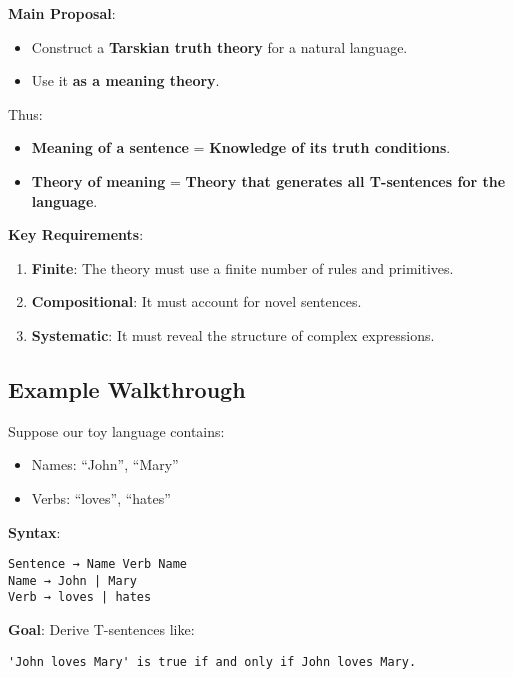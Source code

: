 \documentclass[12pt]{article}
\newcommand{\tightlist}{\itemsep 0pt\parskip 0pt\parsep 0pt}
\begin{document}
\textbf{Main Proposal}:

\begin{itemize}
\tightlist
\item
  Construct a \textbf{Tarskian truth theory} for a natural language.
\item
  Use it \textbf{as a meaning theory}.
\end{itemize}

Thus:

\begin{itemize}
\tightlist
\item
  \textbf{Meaning of a sentence} = \textbf{Knowledge of its truth
  conditions}.
\item
  \textbf{Theory of meaning} = \textbf{Theory that generates all
  T-sentences for the language}.
\end{itemize}

\textbf{Key Requirements}:

\begin{enumerate}
\def\labelenumi{\arabic{enumi}.}
\tightlist
\item
  \textbf{Finite}: The theory must use a finite number of rules and
  primitives.
\item
  \textbf{Compositional}: It must account for novel sentences.
\item
  \textbf{Systematic}: It must reveal the structure of complex
  expressions.
\end{enumerate}

\hypertarget{example-walkthrough}{%
\subsection{Example Walkthrough}\label{example-walkthrough}}

Suppose our toy language contains:

\begin{itemize}
\tightlist
\item
  Names: ``John'', ``Mary''
\item
  Verbs: ``loves'', ``hates''
\end{itemize}

\textbf{Syntax}:

\begin{verbatim}
Sentence → Name Verb Name
Name → John | Mary
Verb → loves | hates
\end{verbatim}

\textbf{Goal}: Derive T-sentences like:

\begin{verbatim}
'John loves Mary' is true if and only if John loves Mary.
\end{verbatim}
\end{document}
